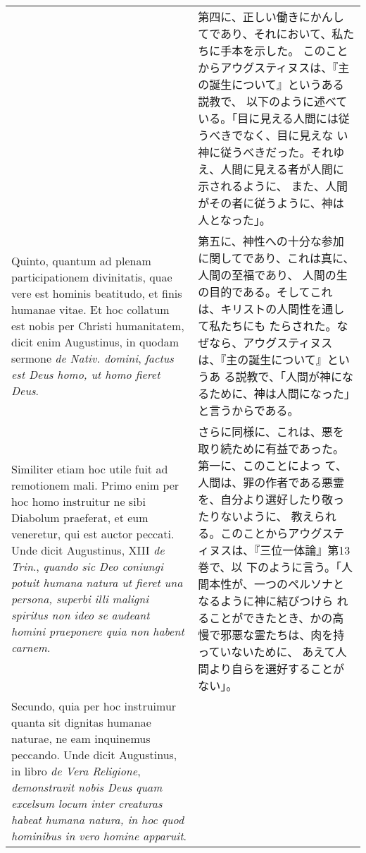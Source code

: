 \documentclass[10pt]{jsarticle} %
\begin{document}
\begin{longtable}{p{21em}p{21em}}
&

第四に、正しい働きにかんしてであり、それにおいて、私たちに手本を示した。
 このことからアウグスティヌスは、『主の誕生について』というある説教で、
 以下のように述べている。「目に見える人間には従うべきでなく、目に見えな
 い神に従うべきだった。それゆえ、人間に見える者が人間に示されるように、
 また、人間がその者に従うように、神は人となった」。


\\


Quinto, quantum ad plenam participationem
 divinitatis, quae vere est hominis beatitudo, et finis humanae
 vitae. Et hoc collatum est nobis per Christi humanitatem, dicit enim
 Augustinus, in quodam sermone {\itshape de Nativ. domini}, {\itshape factus est Deus homo,
 ut homo fieret Deus}. 


&

第五に、神性への十分な参加に関してであり、これは真に、人間の至福であり、
 人間の生の目的である。そしてこれは、キリストの人間性を通して私たちにも
 たらされた。なぜなら、アウグスティヌスは、『主の誕生について』というあ
 る説教で、「人間が神になるために、神は人間になった」と言うからである。


\\


Similiter etiam hoc utile fuit ad remotionem
 mali. Primo enim per hoc homo instruitur ne sibi Diabolum praeferat, et
 eum veneretur, qui est auctor peccati. Unde dicit Augustinus, XIII {\itshape de
 Trin}., {\itshape quando sic Deo coniungi potuit humana natura ut fieret una
 persona, superbi illi maligni spiritus non ideo se audeant homini
 praeponere quia non habent carnem}. 


&

さらに同様に、これは、悪を取り続ために有益であった。第一に、このことによっ
 て、人間は、罪の作者である悪霊を、自分より選好したり敬ったりないように、
 教えられる。このことからアウグスティヌスは、『三位一体論』第13巻で、以
 下のように言う。「人間本性が、一つのペルソナとなるように神に結びつけら
 れることができたとき、かの高慢で邪悪な霊たちは、肉を持っていないために、
 あえて人間より自らを選好することがない」。


\\


Secundo, quia per hoc instruimur
 quanta sit dignitas humanae naturae, ne eam inquinemus peccando. Unde
 dicit Augustinus, in libro {\itshape de Vera Religione}, {\itshape demonstravit nobis Deus
 quam excelsum locum inter creaturas habeat humana natura, in hoc quod
 hominibus in vero homine apparuit}. 



\end{longtable}
\end{document}
